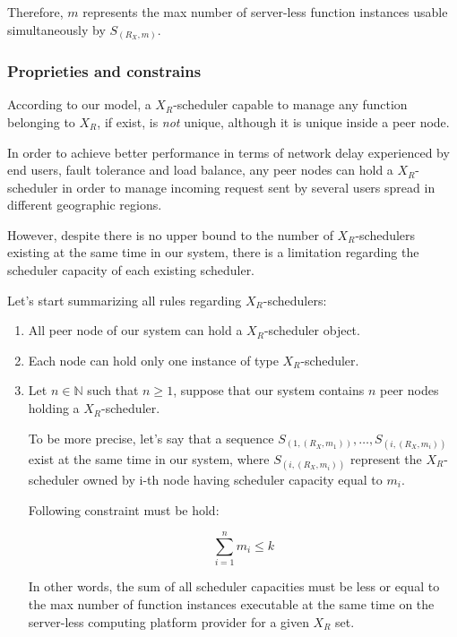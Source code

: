 \documentclass[10pt,a4paper]{article}
\begin{document}
Therefore, $m$ represents the max number of server-less function instances usable simultaneously by $S_{({R_{X}},m)}$.

\subsubsection{Proprieties and constrains}

According to our model, a $X_R$-scheduler capable to manage any function belonging to $X_{R}$, if exist, is \textit{not} unique, although it is unique inside a peer node. 

In order to achieve better performance in terms of network delay experienced by end users, fault tolerance and load balance, any peer nodes can hold a $X_R$-scheduler in order to manage incoming request sent by several users spread in different geographic regions. 

However, despite there is no upper bound to the number of $X_R$-schedulers existing at the same time in our system, there is a limitation regarding the scheduler capacity of each existing scheduler. 

Let's start summarizing all rules regarding $X_R$-schedulers:

\begin{enumerate}

\item All peer node of our system can hold a $X_R$-scheduler object.

\item Each node can hold only one instance of type $X_R$-scheduler.

\item Let $n \in \mathbb{N}$ such that $n \geq 1$, suppose that our system contains $n$ peer nodes holding a $X_R$-scheduler.

To be more precise, let's say that a sequence $S_{(1,({R_{X}},m_1))}, \ldots , S_{(i,({R_{X}},m_i))}$ exist at the same time in our system, where $S_{(i,({R_{X}},m_i))}$ represent the $X_R$-scheduler owned by i-th node having scheduler capacity equal to $m_i$.

Following constraint must be hold:

\begin{equation}
\sum_{i=1}^{n} m_i \leq k
\end{equation}

In other words, the sum of all scheduler capacities must be less or equal to the max number of function instances executable at the same time on the server-less computing platform provider for a given $X_{R}$ set.

\end{enumerate}
\end{document}
